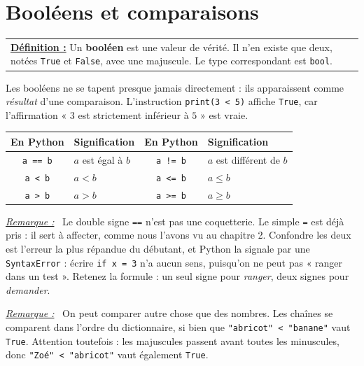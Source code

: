 \documentclass[a4paper,11pt,openany]{book}
\newcommand{\mot}[1]{\textcolor{rougecours}{\textbf{#1}}}
\newcommand{\code}[1]{\texttt{\textcolor{codebleu}{#1}}}
\newenvironment{remarque}%
 {\par\vspace{1mm}\begin{list}{}{\leftmargin=1cm \rightmargin=0.5cm}\item[]%
  \textit{\underline{Remarque :}}~}%
 {\end{list}\vspace{1mm}}
\renewcommand{\arraystretch}{1.4}
\begin{document}
\section{Booléens et comparaisons}

\begin{center}
\begin{tabularx}{15cm}{||X}
\noindent \textbf{\underline{Définition :}} Un \mot{booléen} est une valeur de vérité. Il n'en existe que deux, notées \code{True} et \code{False}, avec une majuscule. Le type correspondant est \code{bool}.
\end{tabularx}
\end{center}

Les booléens ne se tapent presque jamais directement : ils apparaissent comme \emph{résultat} d'une comparaison. L'instruction \code{print(3 < 5)} affiche \code{True}, car l'affirmation « $3$ est strictement inférieur à $5$ » est vraie.

\begin{center}
\renewcommand{\arraystretch}{1.5}
\begin{tabular}{|c|l|c|l|}
\hline
\rowcolor{orange!50} \textbf{En Python} & \textbf{Signification} & \textbf{En Python} & \textbf{Signification} \\
\hline
\code{a == b} & $a$ est égal à $b$ & \code{a != b} & $a$ est différent de $b$ \\
\hline
\code{a < b} & $a < b$ & \code{a <= b} & $a \leqslant b$ \\
\hline
\code{a > b} & $a > b$ & \code{a >= b} & $a \geqslant b$ \\
\hline
\end{tabular}
\end{center}

\begin{remarque}
Le double signe \code{==} n'est pas une coquetterie. Le simple \code{=} est déjà pris : il sert à affecter, comme nous l'avons vu au chapitre 2. Confondre les deux est l'erreur la plus répandue du débutant, et Python la signale par une \code{SyntaxError} : écrire \code{if x = 3} n'a aucun sens, puisqu'on ne peut pas « ranger dans un test ». Retenez la formule : un seul signe pour \emph{ranger}, deux signes pour \emph{demander}.
\end{remarque}

\begin{remarque}
On peut comparer autre chose que des nombres. Les chaînes se comparent dans l'ordre du dictionnaire, si bien que \code{"abricot" < "banane"} vaut \code{True}. Attention toutefois : les majuscules passent avant toutes les minuscules, donc \code{"Zoé" < "abricot"} vaut également \code{True}.
\end{remarque}
\end{document}
